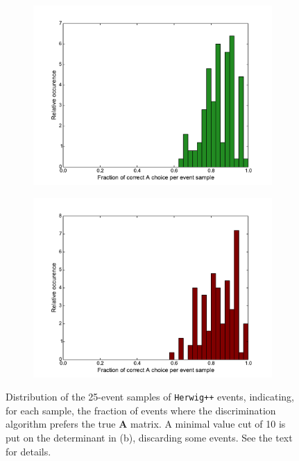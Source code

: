 \documentclass[twoside,english]{uiofysmaster}
\begin{document}
\begin{figure}[hbtp!]
	\centering
	\begin{subfigure}[b]{0.45\textwidth}
		\includegraphics[width=\textwidth]{figures/improving_combinatorics/histogram-pairwise_A_selection-fraction_of_corr_A-nodetAcut.pdf} 
		\caption{ }
		\label{fig:correct_A_preference_distribution_a}
	\end{subfigure}
	\begin{subfigure}[b]{0.45\textwidth}
		\includegraphics[width=\textwidth]{figures/improving_combinatorics/histogram-pairwise_A_selection-fraction_of_corr_A-detAcut10.pdf} 
		\caption{ }
		\label{fig:correct_A_preference_distribution_b}
	\end{subfigure}
	\caption{Distribution of the 25-event samples of {\tt Herwig++} events, indicating, for each sample, the fraction of events where the discrimination algorithm prefers the true $\mathbf{A}$ matrix. A minimal value cut of 10 is put on the determinant in (b), discarding some events. See the text for details.}
	\label{fig:correct_A_preference_distribution}
\end{figure}
\end{document}
